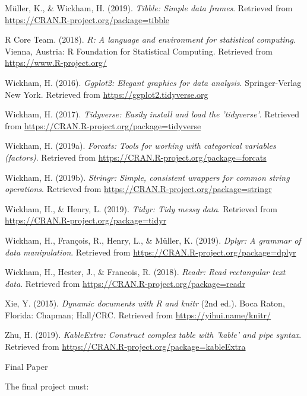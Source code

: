 \documentclass[man]{apa6}
\begin{document}
\hypertarget{ref-R-tibble}{}
Müller, K., \& Wickham, H. (2019). \emph{Tibble: Simple data frames}.
Retrieved from \url{https://CRAN.R-project.org/package=tibble}

\hypertarget{ref-R-base}{}
R Core Team. (2018). \emph{R: A language and environment for statistical
computing}. Vienna, Austria: R Foundation for Statistical Computing.
Retrieved from \url{https://www.R-project.org/}

\hypertarget{ref-R-ggplot2}{}
Wickham, H. (2016). \emph{Ggplot2: Elegant graphics for data analysis}.
Springer-Verlag New York. Retrieved from
\url{https://ggplot2.tidyverse.org}

\hypertarget{ref-R-tidyverse}{}
Wickham, H. (2017). \emph{Tidyverse: Easily install and load the
'tidyverse'}. Retrieved from
\url{https://CRAN.R-project.org/package=tidyverse}

\hypertarget{ref-R-forcats}{}
Wickham, H. (2019a). \emph{Forcats: Tools for working with categorical
variables (factors)}. Retrieved from
\url{https://CRAN.R-project.org/package=forcats}

\hypertarget{ref-R-stringr}{}
Wickham, H. (2019b). \emph{Stringr: Simple, consistent wrappers for
common string operations}. Retrieved from
\url{https://CRAN.R-project.org/package=stringr}

\hypertarget{ref-R-tidyr}{}
Wickham, H., \& Henry, L. (2019). \emph{Tidyr: Tidy messy data}.
Retrieved from \url{https://CRAN.R-project.org/package=tidyr}

\hypertarget{ref-R-dplyr}{}
Wickham, H., François, R., Henry, L., \& Müller, K. (2019). \emph{Dplyr:
A grammar of data manipulation}. Retrieved from
\url{https://CRAN.R-project.org/package=dplyr}

\hypertarget{ref-R-readr}{}
Wickham, H., Hester, J., \& Francois, R. (2018). \emph{Readr: Read
rectangular text data}. Retrieved from
\url{https://CRAN.R-project.org/package=readr}

\hypertarget{ref-R-knitr}{}
Xie, Y. (2015). \emph{Dynamic documents with R and knitr} (2nd ed.).
Boca Raton, Florida: Chapman; Hall/CRC. Retrieved from
\url{https://yihui.name/knitr/}

\hypertarget{ref-R-kableExtra}{}
Zhu, H. (2019). \emph{KableExtra: Construct complex table with 'kable'
and pipe syntax}. Retrieved from
\url{https://CRAN.R-project.org/package=kableExtra}

\endgroup

Final Paper

The final project must:
\end{document}
